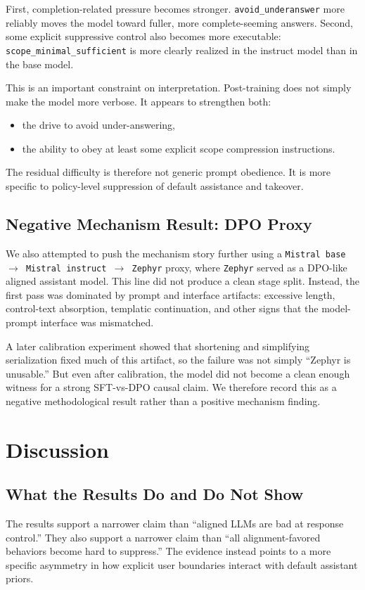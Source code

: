 \documentclass[11pt]{article}
\begin{document}
First, completion-related pressure becomes stronger. \texttt{avoid\_underanswer} more reliably moves the model toward fuller, more complete-seeming answers. Second, some explicit suppressive control also becomes more executable: \texttt{scope\_minimal\_sufficient} is more clearly realized in the instruct model than in the base model.

This is an important constraint on interpretation. Post-training does not simply make the model more verbose. It appears to strengthen both:
\begin{itemize}[leftmargin=1.5em]
  \item the drive to avoid under-answering,
  \item the ability to obey at least some explicit scope compression instructions.
\end{itemize}

The residual difficulty is therefore not generic prompt obedience. It is more specific to policy-level suppression of default assistance and takeover.

\subsection{Negative Mechanism Result: DPO Proxy}
We also attempted to push the mechanism story further using a \texttt{Mistral base $\rightarrow$ Mistral instruct $\rightarrow$ Zephyr} proxy, where \texttt{Zephyr} served as a DPO-like aligned assistant model. This line did not produce a clean stage split. Instead, the first pass was dominated by prompt and interface artifacts: excessive length, control-text absorption, templatic continuation, and other signs that the model-prompt interface was mismatched.

A later calibration experiment showed that shortening and simplifying serialization fixed much of this artifact, so the failure was not simply ``Zephyr is unusable.'' But even after calibration, the model did not become a clean enough witness for a strong SFT-vs-DPO causal claim. We therefore record this as a negative methodological result rather than a positive mechanism finding.

\section{Discussion}
\subsection{What the Results Do and Do Not Show}
The results support a narrower claim than ``aligned LLMs are bad at response control.'' They also support a narrower claim than ``all alignment-favored behaviors become hard to suppress.'' The evidence instead points to a more specific asymmetry in how explicit user boundaries interact with default assistant priors.
\end{document}
